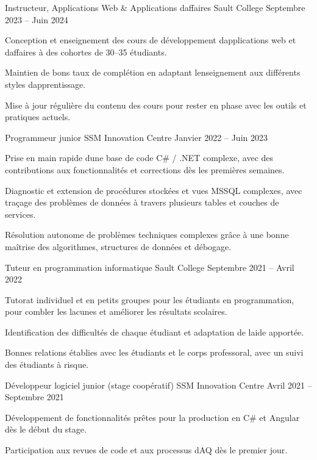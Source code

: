 \documentclass[]{resume-format}
\begin{document}
\begin{cventries}
    \cventry
    { Instructeur, Applications Web \& Applications d\textquotesingle{}affaires }
    { Sault College }
    {}
    { Septembre 2023 -- Juin 2024 }
    {\begin{cvitems}
        \item { Conception et enseignement des cours de développement d\textquotesingle{}applications web et d\textquotesingle{}affaires à des cohortes de 30--35 étudiants. }
        \item { Maintien de bons taux de complétion en adaptant l\textquotesingle{}enseignement aux différents styles d\textquotesingle{}apprentissage. }
        \item { Mise à jour régulière du contenu des cours pour rester en phase avec les outils et pratiques actuels. }
    \end{cvitems}}

    \cventry
    { Programmeur junior }
    { SSM Innovation Centre }
    {}
    { Janvier 2022 -- Juin 2023 }
    {\begin{cvitems}
        \item { Prise en main rapide d\textquotesingle{}une base de code C\# / .NET complexe, avec des contributions aux fonctionnalités et corrections dès les premières semaines. }
        \item { Diagnostic et extension de procédures stockées et vues MSSQL complexes, avec traçage des problèmes de données à travers plusieurs tables et couches de services. }
        \item { Résolution autonome de problèmes techniques complexes grâce à une bonne maîtrise des algorithmes, structures de données et débogage. }
    \end{cvitems}}

    \cventry
    { Tuteur en programmation informatique }
    { Sault College }
    {}
    { Septembre 2021 -- Avril 2022 }
    {\begin{cvitems}
        \item { Tutorat individuel et en petits groupes pour les étudiants en programmation, pour combler les lacunes et améliorer les résultats scolaires. }
        \item { Identification des difficultés de chaque étudiant et adaptation de l\textquotesingle{}aide apportée. }
        \item { Bonnes relations établies avec les étudiants et le corps professoral, avec un suivi des étudiants à risque. }
    \end{cvitems}}
\vspace{6mm}
    \cventry
    { Développeur logiciel junior (stage coopératif) }
    { SSM Innovation Centre }
    {}
    { Avril 2021 -- Septembre 2021 }
    {\begin{cvitems}
        \item { Développement de fonctionnalités prêtes pour la production en C\# et Angular dès le début du stage. }
        \item { Participation aux revues de code et aux processus d\textquotesingle{}AQ dès le premier jour. }
    \end{cvitems}}

\end{cventries}
\end{document}
